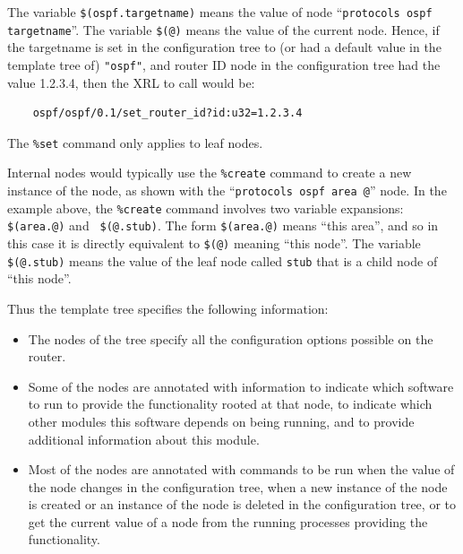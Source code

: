 \documentclass[11pt]{article}
\begin{document}
The variable {\tt \$(ospf.targetname)} means the value of node
``{\tt protocols ospf targetname}''.
The variable {\tt \$(@)} means the value of the current node.
Hence, if the targetname is set in the configuration tree to (or had a default
value in the template tree of) {\tt "ospf"}, and router ID node in the
configuration tree had the value 1.2.3.4, then the XRL to call would be:
\begin{verbatim}
    ospf/ospf/0.1/set_router_id?id:u32=1.2.3.4
\end{verbatim}
The {\tt \%set} command only applies to leaf nodes.  

Internal nodes would typically use the {\tt \%create} command to
create a new instance of the node, as shown with the ``{\tt protocols ospf
area @}'' node.  In the example above, the {\tt \%create} command
involves two variable expansions: {\tt \$(area.@)} and {\tt
\$(@.stub)}.  The form {\tt \$(area.@)} means ``this area'', and so
in this case it is directly equivalent to {\tt \$(@)} meaning ``this node''.
The variable {\tt \$(@.stub)} means the value of the leaf node called
{\tt stub} that is a child node of ``this node''.

Thus the template tree specifies the following information:
\begin{itemize}
\item The nodes of the tree specify all the configuration options
possible on the router.
\item Some of the nodes are annotated with information to indicate
which software to run to provide the functionality rooted at that
node, to indicate which other modules this software depends on
being running, and to provide additional information about this module.
\item Most of the nodes are annotated with commands to be run when the
value of the node changes in the configuration tree, when a new
instance of the node is created or an instance of the node is deleted
in the configuration tree, or to get the current value of a node from
the running processes providing the functionality.
\end{itemize}
\end{document}
